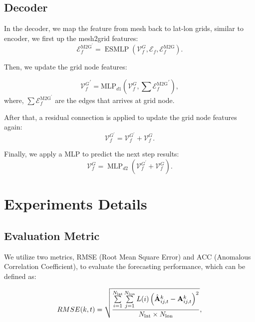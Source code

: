 \subsection{Decoder}
    In the decoder, we map the feature from mesh back to lat-lon grids, similar to encoder, we first up the mesh2grid features:
    \begin{equation}
        \mathcal{E}_f^{\mathrm{M} 2 \mathrm{G}^{\prime}}=\operatorname{ESMLP}\left(\mathcal{V}_f^G, \mathcal{E}_f, \mathcal{E}_f^{\mathrm{M} 2 \mathrm{G}}\right).
    \end{equation}
    
    Then, we update the grid node features:

    \begin{equation}
        {\mathcal{V}_f^G}^{\prime} = {\mathrm{MLP}}_{d1}(\mathcal{V}_f^G, \sum{\mathcal{E}^{\mathrm{M} 2 \mathrm{G}}_f}^{\prime}),
    \end{equation}
    where, $\sum \mathcal{E}_f^{\mathrm{M} 2 \mathrm{G}^{\prime}}$ are the edges that arrives at grid node.

    After that, a residual connection is applied to update the grid node features again:
    \begin{equation}
    \mathcal{V}_f^{G^{\prime}}=\mathcal{V}_f^{G^{\prime}}+\mathcal{V}_f^G.
    \end{equation}

    Finally, we apply a MLP to predict the next step results:
    \begin{equation}
    \mathcal{V}_f^G=\operatorname{MLP}_{d2}\left(\mathcal{V}_f^{G^{\prime}}+\mathcal{V}_f^G\right).
    \end{equation}

    
    
\section{Experiments Details}
\subsection{Evaluation Metric}
\label{appendix_metrics}
    We utilize two metrics, RMSE (Root Mean Square Error) and ACC (Anomalous Correlation Coefficient), to evaluate the forecasting performance, which can be defined as:

    \begin{equation}\small
    {RMSE}(k, t) = \sqrt{\frac{\sum\limits_{i=1}^{N_{\text{lat}}} \sum\limits_{j=1}^{N_{\text{lon}}} L(i) \left( \hat{\mathbf{A}}_{ij,t}^k - \mathbf{A}_{ij,t}^k \right)^2}{N_{\text{lat}} \times N_{\text{lon}}}},
\end{equation}


